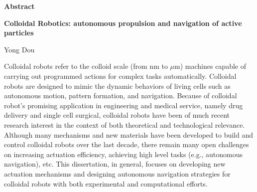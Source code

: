 

\begin{titlepage}
\begin{center}

\vspace*{1\baselineskip}
\textbf{\large Abstract}

\textbf{Colloidal Robotics: autonomous propulsion and navigation of active particles}

Yong Dou
\end{center}

\hspace{5mm}Colloidal robots refer to the colloid scale (from nm to $\mu$m) machines capable of carrying out programmed actions for complex tasks automatically.   Colloidal robots are designed to mimic the dynamic behaviors of living cells such as autonomous motion, pattern formation, and navigation. Because of colloidal robot's promising application in engineering and medical service, namely drug delivery and single cell surgical, colloidal robots have been of much recent research interest in the context of both theoretical and technological relevance. Although many mechanisms and new materials have been developed to build and control colloidal robots over the last decade, there remain many open challenges on increasing actuation efficiency, achieving high level tasks (e.g., autonomous navigation), etc. This dissertation, in general, focuses on developing new actuation mechanisms and designing  autonomous navigation strategies for colloidal robots with both experimental and computational efforts.


\end{titlepage}
